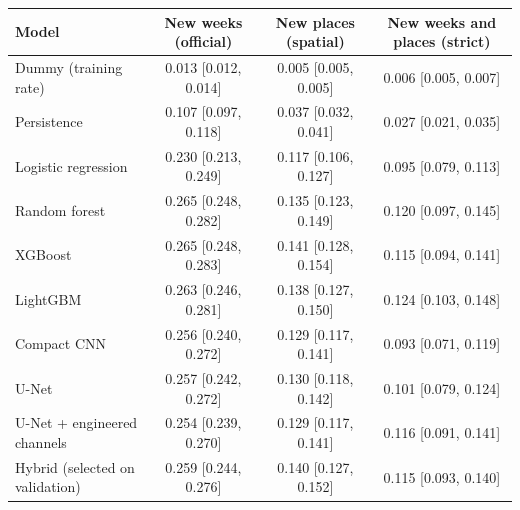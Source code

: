 \begin{tabular}{lccc}
\toprule
Model & New weeks (official) & New places (spatial) & New weeks and places (strict) \\
\midrule
Dummy (training rate) & 0.013 [0.012, 0.014] & 0.005 [0.005, 0.005] & 0.006 [0.005, 0.007] \\
Persistence & 0.107 [0.097, 0.118] & 0.037 [0.032, 0.041] & 0.027 [0.021, 0.035] \\
Logistic regression & 0.230 [0.213, 0.249] & 0.117 [0.106, 0.127] & 0.095 [0.079, 0.113] \\
Random forest & 0.265 [0.248, 0.282] & 0.135 [0.123, 0.149] & 0.120 [0.097, 0.145] \\
XGBoost & 0.265 [0.248, 0.283] & 0.141 [0.128, 0.154] & 0.115 [0.094, 0.141] \\
LightGBM & 0.263 [0.246, 0.281] & 0.138 [0.127, 0.150] & 0.124 [0.103, 0.148] \\
Compact CNN & 0.256 [0.240, 0.272] & 0.129 [0.117, 0.141] & 0.093 [0.071, 0.119] \\
U-Net & 0.257 [0.242, 0.272] & 0.130 [0.118, 0.142] & 0.101 [0.079, 0.124] \\
U-Net + engineered channels & 0.254 [0.239, 0.270] & 0.129 [0.117, 0.141] & 0.116 [0.091, 0.141] \\
Hybrid (selected on validation) & 0.259 [0.244, 0.276] & 0.140 [0.127, 0.152] & 0.115 [0.093, 0.140] \\
\bottomrule
\end{tabular}
